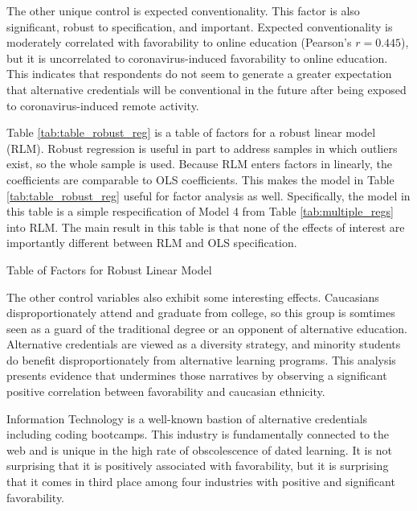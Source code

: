 \documentclass[review]{elsarticle}
\begin{document}
The other unique control is expected conventionality.
This factor is also significant, robust to specification, and important.
Expected conventionality is moderately correlated with favorability to online education (Pearson's $r=0.445$),
but it is uncorrelated to coronavirus-induced favorability to online education.
This indicates that respondents do not seem to generate a greater expectation that alternative credentials will be conventional in the future
after being exposed to coronavirus-induced remote activity.

Table \ref{tab:table_robust_reg} is a table of factors for a robust linear model (RLM).
Robust regression is useful in part to address samples in which outliers exist, so the whole sample is used.
Because RLM enters factors in linearly, the coefficients are comparable to OLS coefficients.
This makes the model in Table \ref{tab:table_robust_reg} useful for factor analysis as well.
Specifically, the model in this table is a simple respecification of Model 4 from Table \ref{tab:multiple_regs} into RLM.
The main result in this table is that none of the effects of interest are importantly different between RLM and OLS specification.

\begin{table}
    \caption{Table of Factors for Robust Linear Model}
    \resizebox{\columnwidth}{!}{
        
    }
    \label{tab:table_robust_reg}
\end{table}

The other control variables also exhibit some interesting effects.
Caucasians disproportionately attend and graduate from college,
so this group is somtimes seen as a guard of the traditional degree or an opponent of alternative education. %
Alternative credentials are viewed as a diversity strategy,
and minority students do benefit disproportionately from alternative learning programs. %
This analysis presents evidence that undermines those narratives by observing a significant positive correlation between favorability and caucasian ethnicity.

Information Technology is a well-known bastion of alternative credentials including coding bootcamps.
This industry is fundamentally connected to the web and is unique in the high rate of obscolescence of dated learning.
It is not surprising that it is positively associated with favorability,
but it is surprising that it comes in third place among four industries with positive and significant favorability.
\end{document}
